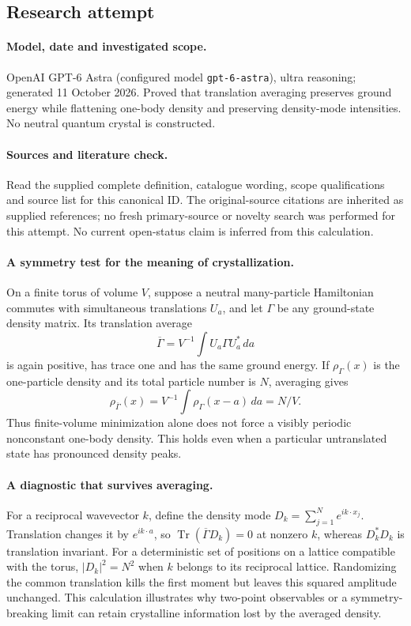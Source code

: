 \documentclass[11pt]{article}
\begin{document}
\subsection{Research attempt}
\paragraph{Model, date and investigated scope.}
OpenAI GPT-6 Astra (configured model \texttt{gpt-6-astra}), ultra reasoning; generated 11 October 2026. Proved that translation averaging preserves ground energy while flattening one-body density and preserving density-mode intensities. No neutral quantum crystal is constructed.

\paragraph{Sources and literature check.}
Read the supplied complete definition, catalogue wording, scope qualifications and source list for this canonical ID. The original-source citations are inherited as supplied references; no fresh primary-source or novelty search was performed for this attempt. No current open-status claim is inferred from this calculation.

\paragraph{A symmetry test for the meaning of crystallization.}On a finite torus of volume \(V\), suppose a neutral many-particle Hamiltonian commutes with simultaneous translations \(U_a\), and let \(\Gamma\) be any ground-state density matrix. Its translation average
\[\overline\Gamma=V^{-1}\int U_a\Gamma U_a^*\,da\]
is again positive, has trace one and has the same ground energy. If \(\rho_\Gamma(x)\) is the one-particle density and its total particle number is \(N\), averaging gives
\[\rho_{\overline\Gamma}(x)=V^{-1}\int\rho_\Gamma(x-a)\,da=N/V.
\]
Thus finite-volume minimization alone does not force a visibly periodic nonconstant one-body density. This holds even when a particular untranslated state has pronounced density peaks.
\paragraph{A diagnostic that survives averaging.}For a reciprocal wavevector \(k\), define the density mode \(D_k=\sum_{j=1}^N e^{ik\cdot x_j}\). Translation changes it by \(e^{ik\cdot a}\), so \(\operatorname{Tr}(\overline\Gamma D_k)=0\) at nonzero \(k\), whereas \(D_k^*D_k\) is translation invariant. For a deterministic set of positions on a lattice compatible with the torus, \(|D_k|^2=N^2\) when \(k\) belongs to its reciprocal lattice. Randomizing the common translation kills the first moment but leaves this squared amplitude unchanged. This calculation illustrates why two-point observables or a symmetry-breaking limit can retain crystalline information lost by the averaged density.
\end{document}
